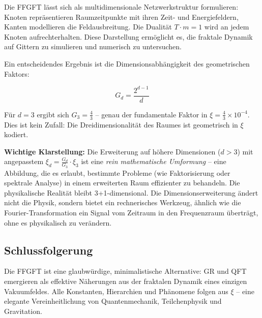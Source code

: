 	Die FFGFT lässt sich als multidimensionale Netzwerkstruktur formulieren: Knoten repräsentieren Raumzeitpunkte mit ihren Zeit- und Energiefeldern, Kanten modellieren die Feldausbreitung. Die Dualität $T \cdot m = 1$ wird an jedem Knoten aufrechterhalten. Diese Darstellung ermöglicht es, die fraktale Dynamik auf Gittern zu simulieren und numerisch zu untersuchen.
	
	Ein entscheidendes Ergebnis ist die Dimensionsabhängigkeit des geometrischen Faktors:
	
	\begin{equation}
		G_d = \frac{2^{d-1}}{d}
	\end{equation}
	
	Für $d = 3$ ergibt sich $G_3 = \frac{4}{3}$ -- genau der fundamentale Faktor in $\xi = \frac{4}{3} \times 10^{-4}$. Dies ist kein Zufall: Die Dreidimensionalität des Raumes ist geometrisch in $\xi$ kodiert.
	
	\textbf{Wichtige Klarstellung:} Die Erweiterung auf höhere Dimensionen ($d > 3$) mit angepasstem $\xi_d = \frac{G_d}{G_3} \cdot \xi_3$ ist eine \textit{rein mathematische Umformung} -- eine Abbildung, die es erlaubt, bestimmte Probleme (wie Faktorisierung oder spektrale Analyse) in einem erweiterten Raum effizienter zu behandeln. Die physikalische Realität bleibt 3+1-dimensional. Die Dimensionserweiterung ändert nicht die Physik, sondern bietet ein rechnerisches Werkzeug, ähnlich wie die Fourier-Transformation ein Signal vom Zeitraum in den Frequenzraum überträgt, ohne es physikalisch zu verändern.
	
	\subsection*{Schlussfolgerung}
	
	Die FFGFT ist eine glaubwürdige, minimalistische Alternative: GR und QFT emergieren als effektive Näherungen aus der fraktalen Dynamik eines einzigen Vakuumfeldes. Alle Konstanten, Hierarchien und Phänomene folgen aus \(\xi\) – eine elegante Vereinheitlichung von Quantenmechanik, Teilchenphysik und Gravitation.



